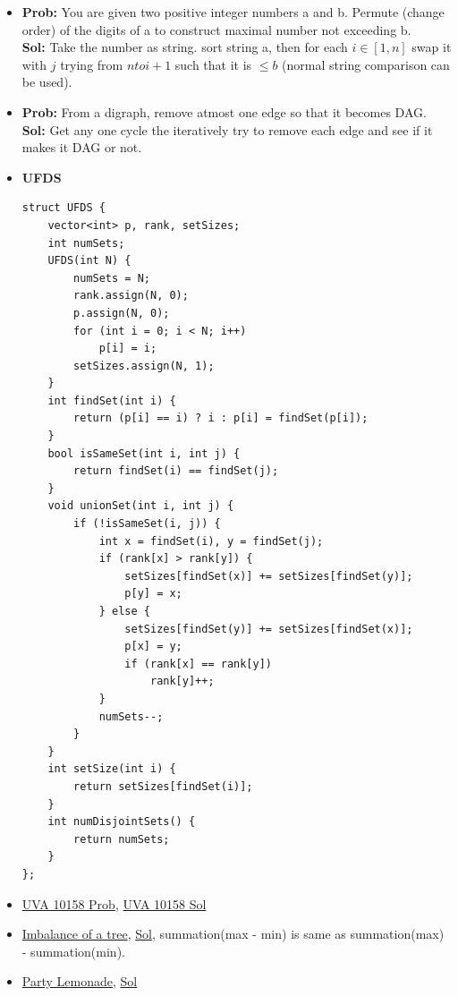 \documentclass[8pt, a4paper, oneside, twocolumn]{extarticle}
\begin{document}
\begin{itemize}
    \item \textbf{Prob: }You are given two positive integer numbers a and b. Permute (change order) of the digits of a to construct maximal number not exceeding b.
    \\\textbf{Sol: }Take the number as string. sort string a, then for each $i \in [1, n]$ swap it with $j$ trying from $n to i + 1$ such that it is $\leq b$ (normal string comparison can be used).
    \item \textbf{Prob: }From a digraph, remove atmost one edge so that it becomes DAG.
    \\\textbf{Sol: }Get any one cycle the iteratively try to remove each edge and see if it makes it DAG or not.
    \item \textbf{UFDS}
    \begin{verbatim}
struct UFDS {
    vector<int> p, rank, setSizes;
    int numSets;
    UFDS(int N) {
        numSets = N;
        rank.assign(N, 0);
        p.assign(N, 0);
        for (int i = 0; i < N; i++)
            p[i] = i;
        setSizes.assign(N, 1);
    }
    int findSet(int i) {
        return (p[i] == i) ? i : p[i] = findSet(p[i]);
    }
    bool isSameSet(int i, int j) {
        return findSet(i) == findSet(j);
    }
    void unionSet(int i, int j) {
        if (!isSameSet(i, j)) {
            int x = findSet(i), y = findSet(j);
            if (rank[x] > rank[y]) {
                setSizes[findSet(x)] += setSizes[findSet(y)];
                p[y] = x;
            } else {
                setSizes[findSet(y)] += setSizes[findSet(x)];
                p[x] = y;
                if (rank[x] == rank[y])
                    rank[y]++;
            }
            numSets--;
        }
    }
    int setSize(int i) {
        return setSizes[findSet(i)];
    }
    int numDisjointSets() {
        return numSets;
    }
};
    \end{verbatim}
    \item \href {https://uva.onlinejudge.org/external/101/10158.pdf}{UVA 10158 Prob}, \href {https://gist.github.com/sourabh2311/3a2daf2a9f77104a94d1db9af8b40b1a}{UVA 10158 Sol}
    \item \href {https://codeforces.com/contest/915/problem/F}{Imbalance of a tree}, \href {https://github.com/sourabh2311/Competitive-Programming/blob/master/CF/ER36/F.cpp}{Sol}, summation(max - min) is same as summation(max) - summation(min).
    \item \href {https://codeforces.com/contest/913/problem/C}{Party Lemonade}, \href {https://codeforces.com/contest/913/submission/34067096}{Sol}

\end{itemize}
\end{document}
